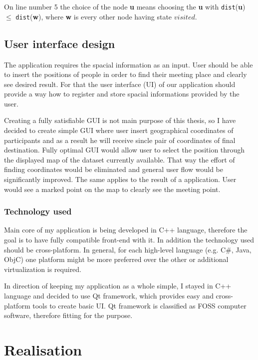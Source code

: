\documentclass[thesis=M,english]{FITthesis}[2012/10/20]
\begin{document}
On line number 5 the choice of the node \textbf{u} means choosing the \textbf{u} with \texttt{dist}(\textbf{u}) $ \leq $ \texttt{dist}(\textbf{w}), where \textbf{w} is every other node having state $visited$.

\section{User interface design}
The application requires the spacial information as an input. 
User should be able to insert the positions of people in order to find their meeting place and clearly see desired result. For that the user interface (UI) of our application should provide a way how to register and store spacial informations provided by the user. 

Creating a fully satisfiable GUI is not main purpose of this thesis, so I have decided to create simple GUI where user insert geographical coordinates of participants and as a result he will receive sincle pair of coordinates of final destination. 
Fully optimal GUI would allow user to select the position through the displayed map of the dataset currently available. That way the effort of finding coordinates would be eliminated and general user flow would be significantly improved. The same applies to the result of a application. User would see a marked point on the map to clearly see the meeting point. 

\subsection{Technology used}
Main core of my application is being developed in C++ language, therefore the goal is to have fully compatible front-end with it. In addition the technology used should be cross-platform. In general, for each high-level language (e.g. C\#, Java, ObjC)	one platform might be more preferred over the other or additional virtualization is required. 

In direction of keeping my application as a whole simple, I stayed in C++ language and decided to use Qt framework, which provides easy and cross-platform tools to create  basic UI. Qt framework is classified as FOSS computer software, therefore fitting for the purpose.


\chapter{Realisation}

\end{document}
